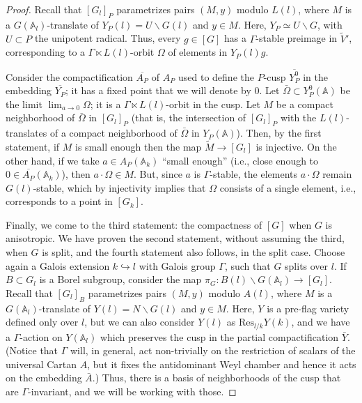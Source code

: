 \begin{proof}
 Recall that $[G_l]_P$ parametrizes pairs $(M,y)$ modulo $L(l)$, where $M$ is a $G(\mathbb A_l)$-translate of $Y_P(l) = U\backslash G(l)$ and $y\in M$. Here, $Y_P \simeq U\backslash G$, with $U\subset P$ the unipotent radical. Thus, every $g\in [G]$ has a $\Gamma$-stable preimage in $\tilde V'$, corresponding to a $\Gamma \ltimes L(l)$-orbit $\Omega$ of elements in $Y_P(l)g$.
 
 Consider the compactification $\overline{A_P}$ of $A_P$ used to define the $P$-cusp $\overline{Y_P^0}$ in the embedding $\overline{Y_P}$; it has a fixed point that we will denote by $0$. Let $\bar\Omega \subset Y_P^0(\mathbb A)$ be the limit $\lim_{a \to 0} \Omega$; it is a $\Gamma \ltimes L(l)$-orbit in the cusp. Let $M$ be a compact neighborhood of $\bar \Omega$ in $[G_l]_P$ (that is, the intersection of $[G_l]_P$ with the $L(l)$-translates of a compact neighborhood of $\bar \Omega$ in $Y_P(\mathbb A)$). Then, by the first statement, if $M$ is small enough then the map $\tilde M\to [G_l]$ is injective. On the other hand, if we take $a \in A_P(\mathbb A_k)$ ``small enough'' (i.e., close enough to $0\in \overline{A_P}(\mathbb A_k)$), then $a\cdot \Omega \in M$. But, since $a$ is $\Gamma$-stable, the elements $a\cdot \Omega$ remain $G(l)$-stable, which by injectivity implies that $\Omega$ consists of a single element, i.e., corresponds to a point in $[G_k]$.
 
 
 Finally, we come to the third statement: the compactness of $[G]$ when $G$ is anisotropic. We have proven the second statement, without assuming the third, when $G$ is split, and the fourth statement also follows, in the split case. Choose again a Galois extension $k\hookrightarrow l$ with Galois group $\Gamma$, such that $G$ splits over $l$. If $B\subset G_l$ is a Borel subgroup, consider the map $\pi_G: B(l)\backslash G(\mathbb A_l) \to [G_l]$.  Recall that $[G_l]_B$ parametrizes pairs $(M,y)$ modulo $A(l)$, where $M$ is a $G(\mathbb A_l)$-translate of $Y(l) = N\backslash G(l)$ and $y\in M$. Here, $Y$ is a pre-flag variety defined only over $l$, but we can also consider $Y(l)$ as $\text{Res}_{l/k} Y(k)$, and we have a $\Gamma$-action on $Y(\mathbb A_l)$ which preserves the cusp in the partial compactification $\bar Y$. (Notice that $\Gamma$ will, in general, act non-trivially on the restriction of scalars of the universal Cartan $A$, but it fixes the antidominant Weyl chamber and hence it acts on the embedding $\bar A$.) Thus, there is a basis of neighborhoods of the cusp that are $\Gamma$-invariant, and we will be working with those. 
 

\end{proof}
